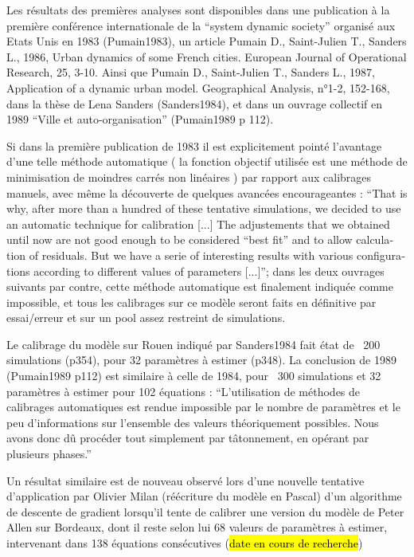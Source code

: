 Les résultats des premières analyses sont disponibles dans une publication à la première conférence internationale de la “system dynamic society” organisé aux Etats Unis en 1983 (Pumain1983), un article Pumain D., Saint-Julien T., Sanders L., 1986, Urban dynamics of some French cities. European Journal of Operational Research, 25, 3-10. Ainsi que Pumain D., Saint-Julien T., Sanders L., 1987, Application of a dynamic urban model. Geographical Analysis, n°1-2, 152-168, dans la thèse de Lena Sanders (Sanders1984), et dans un ouvrage collectif en 1989 “Ville et auto-organisation” (Pumain1989 p 112).

Si dans la première publication de 1983 il est explicitement pointé l’avantage d’une telle méthode automatique ( la fonction objectif utilisée est une méthode de minimisation de moindres carrés non linéaires ) par rapport aux calibrages manuels, avec même la découverte de quelques avancées encourageantes : \foreignquote{english}{That is why, after more than a hundred of these tentative simulations, we decided to use an automatic technique for calibration [...] The adjustements that we obtained until now are not good enough to be considered “best fit” and to allow calculation of residuals. But we have a serie of interesting results with various configurations according to different values of parameters [...]}; dans les deux ouvrages suivants par contre, cette méthode automatique est finalement indiquée comme impossible, et tous les calibrages sur ce modèle seront faits en définitive par essai/erreur et sur un pool assez restreint de simulations.

Le calibrage du modèle sur Rouen indiqué par Sanders1984 fait état de ~200 simulations (p354), pour 32 paramètres à estimer (p348). La conclusion de 1989 (Pumain1989 p112) est similaire à celle de 1984, pour ~300 simulations et 32 paramètres à estimer pour 102 équations : \enquote{L’utilisation de méthodes de calibrages automatiques est rendue impossible par le nombre de paramètres et le peu d’informations sur l’ensemble des valeurs théoriquement possibles. Nous avons donc dû procéder tout simplement par tâtonnement, en opérant par plusieurs phases.}

Un résultat similaire est de nouveau observé lors d’une nouvelle tentative d’application par Olivier Milan (réécriture du modèle en Pascal) d’un algorithme de descente de gradient lorsqu’il tente de calibrer une version du modèle de Peter Allen sur Bordeaux, dont il reste selon lui 68 valeurs de paramètres à estimer, intervenant dans 138 équations consécutives  (\hl{date en cours de recherche})


